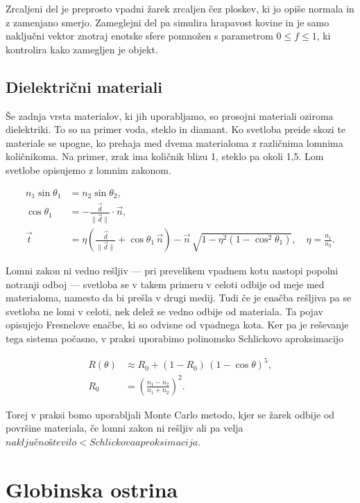 \documentclass[12pt, a4paper]{article}
\begin{document}
Zrcaljeni del je preprosto vpadni žarek zrcaljen čez ploskev, ki jo opiše normala in z zamenjano smerjo.
Zameglejni del pa simulira hrapavost kovine in je samo naključni vektor znotraj enotske sfere pomnožen
s parametrom $0 \leq f \leq 1$, ki kontrolira kako zamegljen je objekt.

\subsection{Dielektrični materiali}
Še zadnja vrsta materialov, ki jih uporabljamo, so prosojni materiali oziroma dielektriki. To so na primer voda,
steklo in diamant. Ko svetloba preide skozi te materiale se upogne, ko prehaja med dvema materialoma z
različnima lomnima količnikoma. Na primer, zrak ima količnik blizu 1, steklo pa okoli 1,5. Lom svetlobe opisujemo
z lomnim zakonom.

$$
\begin{aligned}
n_1 \sin\theta_1 &= n_2 \sin\theta_2, \\
\cos\theta_1 &= -\frac{\vec{d}}{\lVert \vec{d} \rVert} \cdot \vec{n}, \\
\vec{t} &= \eta \left(\frac{\vec{d}}{\lVert \vec{d} \rVert} + \cos\theta_1\,\vec{n}\right)
          - \vec{n}\,\sqrt{1 - \eta^2\!\left(1 - \cos^2\theta_1\right)}, \quad \eta = \frac{n_1}{n_2}.
\end{aligned}
$$


Lomni zakon ni vedno rešljiv — pri prevelikem vpadnem kotu nastopi popolni notranji odboj — svetloba se v takem
primeru v celoti odbije od meje med materialoma, namesto da bi prešla v drugi medij. Tudi če je enačba rešljiva
pa se svetloba ne lomi v celoti, nek delež se vedno odbije od materiala. Ta pojav opisujejo Fresnelove enačbe, ki
so odvisne od vpadnega kota. Ker pa je reševanje tega sistema počasno, v praksi uporabimo polinomsko Schlickovo
aproksimacijo

$$
\begin{aligned}
R(\theta) &\approx R_0 + (1 - R_0)\,(1 - \cos\theta)^5, \\
R_0 &= \left(\frac{n_1 - n_2}{n_1 + n_2}\right)^2.
\end{aligned}
$$

Torej v praksi bomo uporabljali Monte Carlo metodo, kjer se žarek odbije od površine materiala, če lomni zakon
ni rešljiv ali pa velja $naključno število < Schlickova aproksimacija$.

\section{Globinska ostrina}
\end{document}

